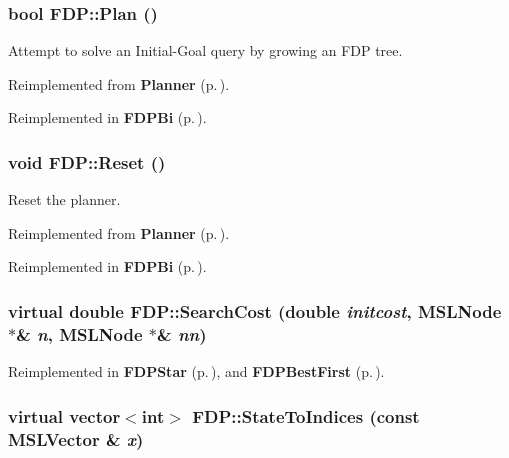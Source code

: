 \subsubsection{\setlength{\rightskip}{0pt plus 5cm}bool FDP::Plan ()\hspace{0.3cm}{\tt  [virtual]}}\label{class_FDP_a3}


Attempt to solve an Initial-Goal query by growing an FDP tree.



Reimplemented from {\bf Planner} {\rm (p.\,\pageref{class_Planner_a4})}.

Reimplemented in {\bf FDPBi} {\rm (p.\,\pageref{class_FDPBi_a3})}.
\subsubsection{\setlength{\rightskip}{0pt plus 5cm}void FDP::Reset ()\hspace{0.3cm}{\tt  [virtual]}}\label{class_FDP_a2}


Reset the planner.



Reimplemented from {\bf Planner} {\rm (p.\,\pageref{class_Planner_a2})}.

Reimplemented in {\bf FDPBi} {\rm (p.\,\pageref{class_FDPBi_a2})}.
\subsubsection{\setlength{\rightskip}{0pt plus 5cm}virtual double FDP::Search\-Cost (double {\em initcost}, {\bf MSLNode} $\ast$\& {\em n}, {\bf MSLNode} $\ast$\& {\em nn})\hspace{0.3cm}{\tt  [protected, virtual]}}\label{class_FDP_b0}




Reimplemented in {\bf FDPStar} {\rm (p.\,\pageref{class_FDPStar_b0})}, and {\bf FDPBest\-First} {\rm (p.\,\pageref{class_FDPBestFirst_b0})}.
\subsubsection{\setlength{\rightskip}{0pt plus 5cm}virtual vector$<$int$>$ FDP::State\-To\-Indices (const {\bf MSLVector} \& {\em x})\hspace{0.3cm}{\tt  [protected, virtual]}}\label{class_FDP_b1}




